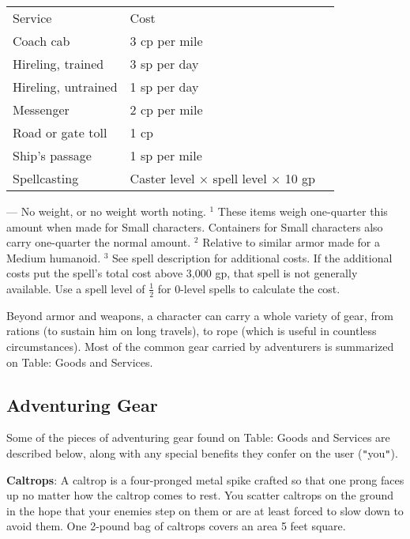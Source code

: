 \begin{table}[]
\begin{tabular}{lll}
 Service & Cost\\
Coach cab & 3 cp per mile\\
Hireling, trained & 3 sp per day\\
Hireling, untrained & 1 sp per day\\
Messenger & 2 cp per mile\\
Road or gate toll & 1 cp\\
Ship's passage & 1 sp per mile\\
Spellcasting & Caster level × spell level × 10 gp\\
\end{tabular}
--- No weight, or no weight worth noting.
\(^{1}\) These items weigh one-quarter this amount when made for Small characters. Containers for Small characters also carry one-quarter the normal amount.
\(^{2}\) Relative to similar armor made for a Medium humanoid.
\(^{3}\) See spell description for additional costs. If the additional costs put the spell's total cost above 3,000 gp, that spell is not generally available. Use a spell level of \mbox{$\frac12$} for 0-level spells to calculate the cost.

\end{table}
	
Beyond armor and weapons, a character can carry a whole variety of gear, from rations (to sustain him on long travels), to rope (which is useful in countless circumstances). Most of the common gear carried by adventurers is summarized on Table: Goods and Services.
	
\subsection{Adventuring Gear}

		
Some of the pieces of adventuring gear found on Table: Goods and Services are described below, along with any special benefits they confer on the user (\texttt{{}"{}}you\texttt{{}"{}}).
		
\textbf{Caltrops}: A caltrop is a four-pronged metal spike crafted so that one prong faces up no matter how the caltrop comes to rest. You scatter caltrops on the ground in the hope that your enemies step on them or are at least forced to slow down to avoid them. One 2-pound bag of caltrops covers an area 5 feet square.
		
